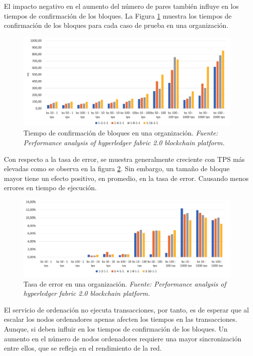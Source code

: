 El impacto negativo en el aumento del n\'umero de pares tambi\'en influye en los tiempos de confirmaci\'on de los bloques. La Figura \ref{BlockCommit} muestra los tiempos de confirmaci\'on de los bloques para cada caso de prueba en una organizaci\'on.\\

\begin{figure}[h]
\centering
\includegraphics[width=0.6\linewidth]{Graphics/BlockCommit.png}
\caption{Tiempo de confirmaci\'on de bloques en una organizaci\'on. \emph{Fuente: Performance analysis of hyperledger fabric 2.0 blockchain platform.}}
\label{BlockCommit}
\end{figure}

Con respecto a la tasa de error, se muestra generalmente creciente con TPS m\'as elevadas como se observa en la figura \ref{ErrorRate}. Sin embargo, un tama\~no de bloque mayor tiene un efecto positivo, en promedio, en la tasa de error. Causando menos errores en tiempo de ejecuci\'on.\\

\begin{figure}[h]
\centering
\includegraphics[width=0.6\linewidth]{Graphics/ErrorRate.png}
\caption{Tasa de error en una organizaci\'on. \emph{Fuente: Performance analysis of hyperledger fabric 2.0 blockchain platform.}}
\label{ErrorRate}
\end{figure}

El servicio de ordenaci\'on no ejecuta transacciones, por tanto, es de esperar que al escalar los nodos ordenadores apenas afecten los tiempos en las transacciones. Aunque, si deben influir en los tiempos de confirmaci\'on de los bloques. Un aumento en el n\'umero de nodos ordenadores requiere una mayor sincronizaci\'on entre ellos, que se refleja en el rendimiento de la red.\\

